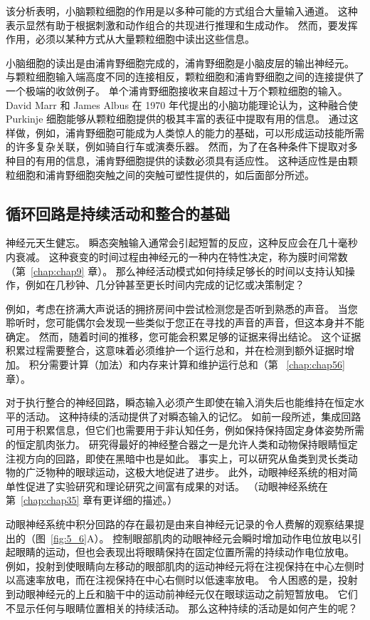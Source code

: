 该分析表明，小脑颗粒细胞的作用是以多种可能的方式组合大量输入通道。
这种表示显然有助于根据刺激和动作组合的共现进行推理和生成动作。
然而，要发挥作用，必须以某种方式从大量颗粒细胞中读出这些信息。


小脑细胞的读出是由浦肯野细胞完成的，浦肯野细胞是小脑皮层的输出神经元。
与颗粒细胞输入端高度不同的连接相反，颗粒细胞和浦肯野细胞之间的连接提供了一个极端的收敛例子。
单个浦肯野细胞接收来自超过十万个颗粒细胞的输入。
David Marr 和 James Albus 在 1970 年代提出的小脑功能理论认为，这种融合使 Purkinje 细胞能够从颗粒细胞提供的极其丰富的表征中提取有用的信息。
通过这样做，例如，浦肯野细胞可能成为人类惊人的能力的基础，可以形成运动技能所需的许多复杂关联，例如骑自行车或演奏乐器。
然而，为了在各种条件下提取对多种目的有用的信息，浦肯野细胞提供的读数必须具有适应性。
这种适应性是由颗粒细胞和浦肯野细胞突触之间的突触可塑性提供的，如后面部分所述。



\subsection{循环回路是持续活动和整合的基础}

神经元天生健忘。 
瞬态突触输入通常会引起短暂的反应，这种反应会在几十毫秒内衰减。
这种衰变的时间过程由神经元的一种内在特性决定，称为膜时间常数（第~\ref{chap:chap9} 章）。
那么神经活动模式如何持续足够长的时间以支持认知操作，例如在几秒钟、几分钟甚至更长时间内完成的记忆或决策制定？


例如，考虑在挤满大声说话的拥挤房间中尝试检测您是否听到熟悉的声音。
当您聆听时，您可能偶尔会发现一些类似于您正在寻找的声音的声音，但这本身并不能确定。
然而，随着时间的推移，您可能会积累足够的证据来得出结论。
这个证据积累过程需要整合，这意味着必须维护一个运行总和，并在检测到额外证据时增加。
积分需要计算（加法）和内存来计算和维护运行总和（第 ~\ref{chap:chap56} 章）。


对于执行整合的神经回路，瞬态输入必须产生即使在输入消失后也能维持在恒定水平的活动。
这种持续的活动提供了对瞬态输入的记忆。
如前一段所述，集成回路可用于积累信息，但它们也需要用于非认知任务，例如保持保持固定身体姿势所需的恒定肌肉张力。
研究得最好的神经整合器之一是允许人类和动物保持眼睛恒定注视方向的回路，即使在黑暗中也是如此。
事实上，可以研究从鱼类到灵长类动物的广泛物种的眼球运动，这极大地促进了进步。
此外，动眼神经系统的相对简单性促进了实验研究和理论研究之间富有成果的对话。
（动眼神经系统在第~\ref{chap:chap35} 章有更详细的描述。）


动眼神经系统中积分回路的存在最初是由来自神经元记录的令人费解的观察结果提出的（图~\ref{fig:5_6}A）。
控制眼部肌肉的动眼神经元会瞬时增加动作电位放电以引起眼睛的运动，但也会表现出将眼睛保持在固定位置所需的持续动作电位放电。
例如，投射到使眼睛向左移动的眼部肌肉的运动神经元将在注视保持在中心左侧时以高速率放电，而在注视保持在中心右侧时以低速率放电。
令人困惑的是，投射到动眼神经元的上丘和脑干中的运动前神经元仅在眼球运动之前短暂放电。
它们不显示任何与眼睛位置相关的持续活动。
那么这种持续的活动是如何产生的呢？


